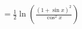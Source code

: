\documentclass[preview]{standalone}
\begin{document}
\begin{align*}
=\frac{1}{2} \ln \left( \frac{(1 + \sin{x})^2}{\cos^2{x}} \right)
\end{align*}
\end{document}
